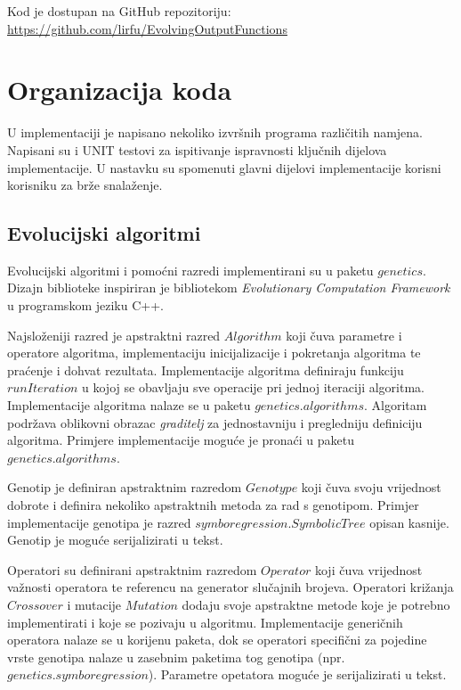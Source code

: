 \documentclass[times, utf8, numeric, diplomski]{fer}
\begin{document}
\noindent
Kod je dostupan na GitHub repozitoriju: \\
\url{https://github.com/lirfu/EvolvingOutputFunctions}

\section{Organizacija koda}
U implementaciji je napisano nekoliko izvršnih programa različitih namjena. Napisani su i UNIT testovi za ispitivanje ispravnosti ključnih dijelova implementacije. U nastavku su spomenuti glavni dijelovi implementacije korisni korisniku za brže snalaženje.

\subsection{Evolucijski algoritmi}
Evolucijski algoritmi i pomoćni razredi implementirani su u paketu $genetics$. Dizajn biblioteke inspiriran je bibliotekom \textit{Evolutionary Computation Framework} \citep{ecf} u programskom jeziku C++. 

Najsloženiji razred je apstraktni razred $Algorithm$ koji čuva parametre i operatore algoritma, implementaciju inicijalizacije i pokretanja algoritma te praćenje i dohvat rezultata. Implementacije algoritma definiraju funkciju $runIteration$ u kojoj se obavljaju sve operacije pri jednoj iteraciji algoritma. Implementacije algoritma nalaze se u paketu $genetics.algorithms$. Algoritam podržava oblikovni obrazac \textit{graditelj} za jednostavniju i pregledniju definiciju algoritma. Primjere implementacije moguće je pronaći u paketu $genetics.algorithms$.

Genotip je definiran apstraktnim razredom $Genotype$ koji čuva svoju vrijednost dobrote i definira nekoliko apstraktnih metoda za rad s genotipom. Primjer implementacije genotipa je razred $symboregression.SymbolicTree$ opisan kasnije. Genotip je moguće serijalizirati u tekst.

Operatori su definirani apstraktnim razredom $Operator$ koji čuva vrijednost važnosti operatora te referencu na generator slučajnih brojeva. Operatori križanja $Crossover$ i mutacije $Mutation$ dodaju svoje apstraktne metode koje je potrebno implementirati i koje se pozivaju u algoritmu. Implementacije generičnih operatora nalaze se u korijenu paketa, dok se operatori specifični za pojedine vrste genotipa nalaze u zasebnim paketima tog genotipa (npr. $genetics.symboregression$). Parametre opetatora moguće je serijalizirati u tekst.
\end{document}
